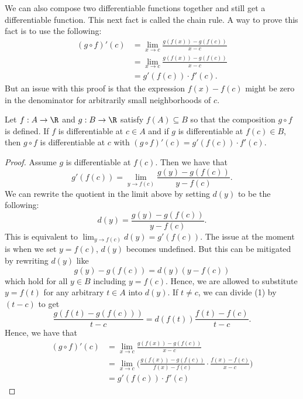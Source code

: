 We can also compose two differentiable functions together and still get a differentiable function. This next fact is called the chain rule. A way to prove this fact is to use the following:
\begin{align*}
   (g \circ f)'(c) &= \lim_{ x \to c  } \frac{ g(f(x)) - g(f(c) ) }{ x - c  }  \\
                   &= \lim_{ x \to c  } \frac{ g(f(x) ) - g(f(c) ) }{ x - c  } \\
                   &= g'(f(c) ) \cdot f'(c).
\end{align*}
But an issue with this proof is that the expression \( f(x) - f(c)  \) might be zero in the denominator for arbitrarily small neighborhoods of \( c  \).

\begin{tcolorbox}
    \begin{thm}
    Let \( f: A \to \R  \) and \( g: B \to \R  \) satisfy \( f(A) \subseteq B  \) so that the composition \(  g  \circ f \) is defined. If \( f  \) is differentiable at \( c \in A  \) and if \( g  \) is differentiable at \( f(c) \in B   \), then \( g \circ f  \) is differentiable at \( c  \) with \( (g \circ f)'(c) = g'(f(c)) \cdot f'(c)\).
    \end{thm}
\end{tcolorbox}

\begin{proof}
Assume \( g  \) is differentiable at \( f(c)  \). Then we have that 
\[  g'(f(c) )  = \lim_{ y  \to f(c)  }  \frac{ g(y) - g(f(c)) }{ y - f(c)  }.\]
We can rewrite the quotient in the limit above by setting \( d(y)  \) to be the following:
\[  d(y) = \frac{ g(y) -  g(f(c) ) }{ y - f(c)  }. \]
This is equivalent to \( \lim_{ y \to f(c)  } d(y) = g'(f(c) ) \). The issue at the moment is when we set \( y = f(c)   \), \( d(y)  \) becomes undefined. But this can be mitigated by rewriting \( d(y)  \) like 
\[  g(y) - g(f(c)) = d(y) (y - f(c)) \tag{1} \]
which hold for all \( y \in B  \) including \( y = f(c)  \). Hence, we are allowed to substitute \( y = f(t)  \) for any arbitrary \( t \in A  \) into \( d(y)  \). If \( t \neq c  \), we can divide (1) by \( (t - c ) \) to get 
\[  \frac{ g(f(t) - g(f(c) )) }{ t - c  } = d(f(t)) \frac{ f(t) - f(c)  }{ t - c  }. \]
Hence, we have that 
\begin{align*}
    (g \circ f)'(c) &= \lim_{ x \to c  }  \frac{ g(f(x)) - g(f(c)) }{ x - c   } \\
                    &= \lim_{ x \to c  } \Big( \frac{ g(f(x))  - g(f(c) )}{f(x) - f(c)  } \cdot \frac{ f(x) - f(c) }{ x - c  } \Big) \\
                    &= g'(f(c)) \cdot f'(c)
\end{align*}
\end{proof}

